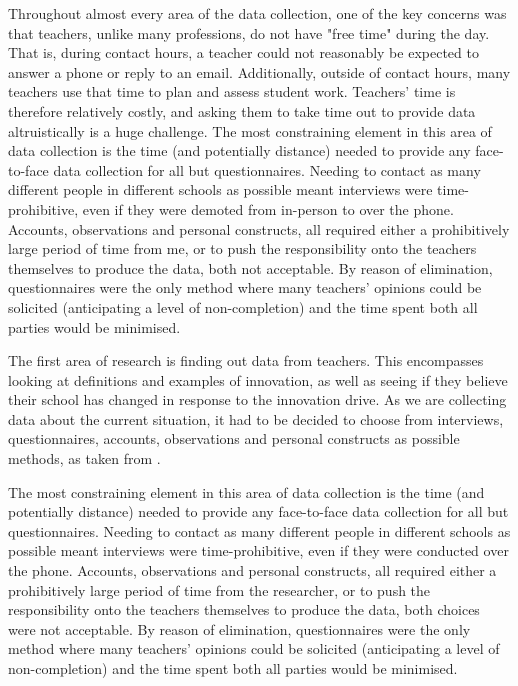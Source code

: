 Throughout almost every area of the data collection, one of the key concerns was that teachers, unlike many professions, do not have "free time" during the day. That is, during contact hours, a teacher could not reasonably be expected to answer a phone or reply to an email. Additionally, outside of contact hours, many teachers use that time to plan and assess student work. Teachers' time is therefore relatively costly, and asking them to take time out to provide data altruistically is a huge challenge.
The most constraining element in this area of data collection is the time (and potentially distance) needed to provide any face-to-face data collection for all but questionnaires. Needing to contact as many different people in different schools as possible meant interviews were time-prohibitive, even if they were demoted from in-person to over the phone. Accounts, observations and personal constructs, all required either a prohibitively large period of time from me, or to push the responsibility onto the teachers themselves to produce the data, both not acceptable. By reason of elimination, questionnaires were the only method where many teachers' opinions could be solicited (anticipating a level of non-completion) and the time spent both all parties would be minimised.

The first area of research is finding out data from teachers. This encompasses looking at definitions and examples of innovation, as well as seeing if they believe their school has changed in response to the innovation drive. As we are collecting data about the current situation, it had to be decided to choose from interviews, questionnaires, accounts, observations and personal constructs as possible methods, as taken from \citet{Cohen2005}.

The most constraining element in this area of data collection is the time (and potentially distance) needed to provide any face-to-face data collection for all but questionnaires. Needing to contact as many different people in different schools as possible meant interviews were time-prohibitive, even if they were conducted over the phone. Accounts, observations and personal constructs, all required either a prohibitively large period of time from the researcher, or to push the responsibility onto the teachers themselves to produce the data, both choices were not acceptable. By reason of elimination, questionnaires were the only method where many teachers' opinions could be solicited (anticipating a level of non-completion) and the time spent both all parties would be minimised. 


